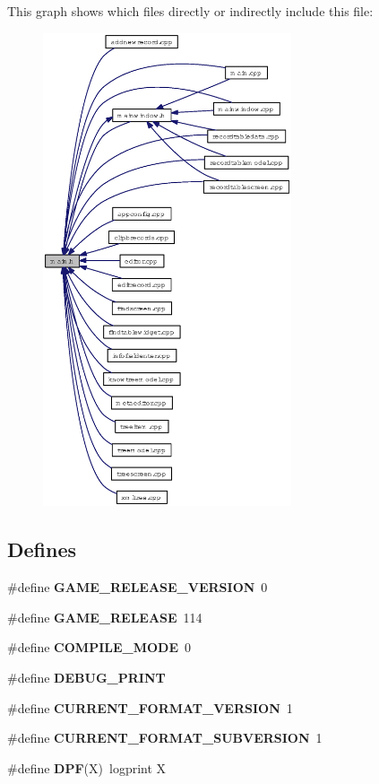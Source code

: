 This graph shows which files directly or indirectly include this file:\begin{figure}[H]
\begin{center}
\leavevmode
\includegraphics[width=208pt]{main_8h__dep__incl}
\end{center}
\end{figure}
\subsection*{Defines}
\begin{CompactItemize}
\item 
\#define {\bf GAME\_\-RELEASE\_\-VERSION}~0
\item 
\#define {\bf GAME\_\-RELEASE}~114
\item 
\#define {\bf COMPILE\_\-MODE}~0
\item 
\#define {\bf DEBUG\_\-PRINT}
\item 
\#define {\bf CURRENT\_\-FORMAT\_\-VERSION}~1
\item 
\#define {\bf CURRENT\_\-FORMAT\_\-SUBVERSION}~1
\item 
\#define {\bf DPF}(X)~logprint X
\end{CompactItemize}
